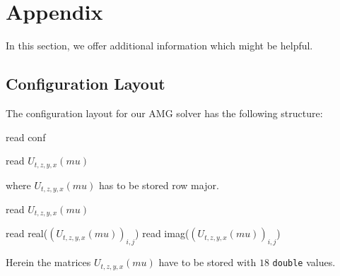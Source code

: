 \documentclass[a4paper,12pt]{scrartcl}
\begin{document}
\section{Appendix}
In this section, we offer additional information which might be helpful.

\subsection{Configuration Layout}
The configuration layout for our AMG solver has the following structure:
%
\begin{algorithm}[H]
  \caption{read conf}\label{readconf}
  \begin{algorithmic}[1]
		\STATE read $U_{t,z,y,x}(mu)$
	      \ENDFOR
	    \ENDFOR  
	 \ENDFOR  
      \ENDFOR  
    \ENDFOR  
  \end{algorithmic}
\end{algorithm}
%
\noindent where $U_{t,z,y,x}(mu) $ has to be stored row major.
%
\begin{algorithm}[H]
  \caption{read $U_{t,z,y,x}(mu)$}\label{readU}
  \begin{algorithmic}[1]
	\STATE read real($(U_{t,z,y,x}(mu))_{i,j}$)
	\STATE read imag($(U_{t,z,y,x}(mu))_{i,j}$)
      \ENDFOR  
    \ENDFOR
  \end{algorithmic}
\end{algorithm}
%
\noindent Herein the matrices $U_{t,z,y,x}(mu)$ have to be stored with $18$ \texttt{double} values.



\end{document}
